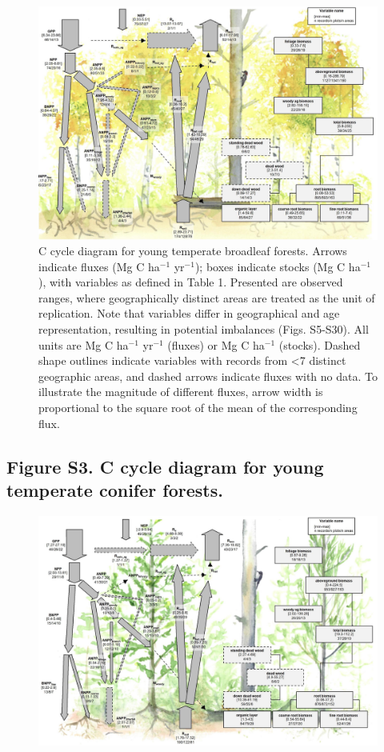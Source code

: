 \documentclass[
]{article}
\begin{document}
\begin{landscape}
\begin{figure}[H]

{\centering \includegraphics[width=0.84\linewidth]{tables_figures/C_cycle_diagrams/Temperate_broadleaf_YOUNG} 

}

\caption{C cycle diagram for young temperate broadleaf forests. Arrows indicate fluxes (Mg C ha$^{-1}$ yr$^{-1}$); boxes indicate stocks (Mg C ha$^{-1}$), with variables as defined in Table 1. Presented are observed ranges, where geographically distinct areas are treated as the unit of replication. Note that variables differ in geographical and age representation, resulting in potential imbalances (Figs. S5-S30). All units are Mg C ha$^{-1}$ yr$^{-1}$ (fluxes) or Mg C ha$^{-1}$ (stocks). Dashed shape outlines indicate variables with records from <7 distinct geographic areas, and dashed arrows indicate fluxes with no data. To illustrate the magnitude of different fluxes, arrow width is proportional to the square root of the mean of the corresponding flux.}\label{fig:unnamed-chunk-5}
\end{figure}

\hypertarget{figure-s3.-c-cycle-diagram-for-young-temperate-conifer-forests.}{%
\subsection{Figure S3. C cycle diagram for young temperate conifer
forests.}\label{figure-s3.-c-cycle-diagram-for-young-temperate-conifer-forests.}}

\begin{figure}[H]

{\centering \includegraphics[width=0.84\linewidth]{tables_figures/C_cycle_diagrams/Temperate_conifer_YOUNG} 

}
\end{figure}
\end{landscape}
\end{document}

